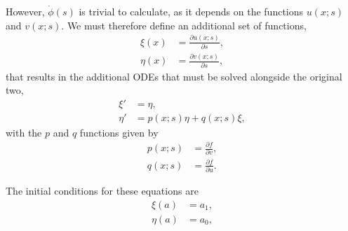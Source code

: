 However, $\dot{\phi}(s)$ is trivial to calculate, as it depends on the functions $u(x;s)$ and $v(x;s)$. We must therefore define an additional set of functions, 
\begin{align}
    \xi(x) & = \frac{\partial u(x;s)}{\partial s},\\
    \eta(x) & = \frac{\partial v(x;s)}{\partial s},
\end{align}
that results in the additional ODEs that must be solved alongside the original two,
\begin{align}
    \xi' & = \eta,\\
    \eta' & = p(x;s)\eta +q(x;s) \xi,
\end{align}
with the $p$ and $q$ functions given by
\begin{align}
    p(x;s) & = \frac{\partial f}{\partial v},\\
    q(x;s) & = \frac{\partial f}{\partial u}.
\end{align}

The initial conditions for these equations are 
\begin{align}
    \xi(a) & = a_1, \\
    \eta(a) & = a_0,
\end{align}

